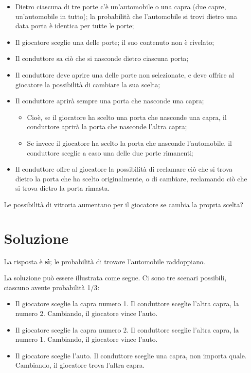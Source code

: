 \documentclass[a4paper, 12pt]{report}
\begin{document}
\begin{itemize}
	\item Dietro ciascuna di tre porte c'è un'automobile o una capra (due capre, un'automobile in tutto); la probabilità che l'automobile si trovi dietro una data porta è identica per tutte le porte;
	\item Il giocatore sceglie una delle porte; il suo contenuto non è rivelato;
	\item Il conduttore sa ciò che si nasconde dietro ciascuna porta;
	\item Il conduttore deve aprire una delle porte non selezionate, e deve offrire al giocatore la possibilità di cambiare la sua scelta;
	\item Il conduttore aprirà sempre una porta che nasconde una capra;
	      \begin{itemize}
		      \item Cioè, se il giocatore ha scelto una porta che nasconde una capra, il conduttore aprirà la porta che nasconde l'altra capra;
		      \item Se invece il giocatore ha scelto la porta che nasconde l'automobile, il conduttore sceglie a caso una delle due porte rimanenti;
	      \end{itemize}
	\item Il conduttore offre al giocatore la possibilità di reclamare ciò che si trova dietro la porta che ha scelto originalmente, o di cambiare, reclamando ciò che si trova dietro la porta rimasta.
\end{itemize}

Le possibilità di vittoria aumentano per il giocatore se cambia la propria scelta?

\section{Soluzione}
La risposta è \textbf{sì}; le probabilità di trovare l'automobile raddoppiano.

La soluzione può essere illustrata come segue. Ci sono tre scenari possibili, ciascuno avente probabilità 1/3:

\begin{itemize}
	\item Il giocatore sceglie la capra numero 1. Il conduttore sceglie l'altra capra, la numero 2. Cambiando, il giocatore vince l'auto.
	\item Il giocatore sceglie la capra numero 2. Il conduttore sceglie l'altra capra, la numero 1. Cambiando, il giocatore vince l'auto.
	\item Il giocatore sceglie l'auto. Il conduttore sceglie una capra, non importa quale. Cambiando, il giocatore trova l'altra capra.
\end{itemize}
\end{document}
